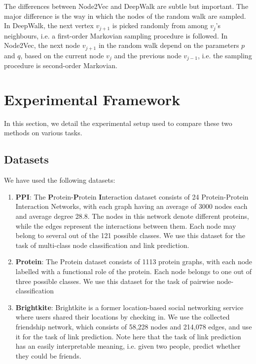 \documentclass[sigconf]{acmart}
\begin{document}
The differences between Node2Vec and DeepWalk are subtle but important. The major difference is the way in which the nodes of the random walk are sampled. In DeepWalk, the next vertex $v_{j+1}$ is picked randomly from among $v_j$'s neighbours, i.e. a first-order Markovian sampling procedure is followed. In Node2Vec, the next node $v_{j+1}$ in the random walk depend on the parameters $p$ and $q$, based on the current node $v_{j}$ and the previous node $v_{j-1}$, i.e. the sampling procedure is second-order Markovian.
 
\section{Experimental Framework}
In this section, we detail the experimental setup used to compare these two methods on various tasks. 

\subsection{Datasets}
We have used the following datasets:
\begin{enumerate}
    \item \textbf{PPI}: The \textbf{P}rotein-\textbf{P}rotein \textbf{I}nteraction dataset \cite{zitnik2017predicting} consists of 24 Protein-Protein Interaction Networks, with each graph having an average of 3000 nodes each and average degree 28.8. The nodes in this network denote different proteins, while the edges represent the interactions between them. Each node may belong to several out of the 121 possible classes. We use this dataset for the task of multi-class node classification and link prediction. 
    
    \item \textbf{Protein}: The Protein dataset \cite{borgwardt2005shortest} consists of 1113 protein graphs, with each node labelled with a functional role of the protein. Each node belongs to one out of three possible classes. We use this dataset for the task of pairwise node-classification
    
    \item \textbf{Brightkite}: Brightkite \cite{cho2011friendship} is a former location-based social networking service where users shared their locations by checking in. We use the collected friendship network, which consists of 58,228 nodes and 214,078 edges, and use it for the task of link prediction. Note here that the task of link prediction has an easily interpretable meaning, i.e. given two people, predict whether they could be friends.
    
\end{enumerate}
\end{document}
